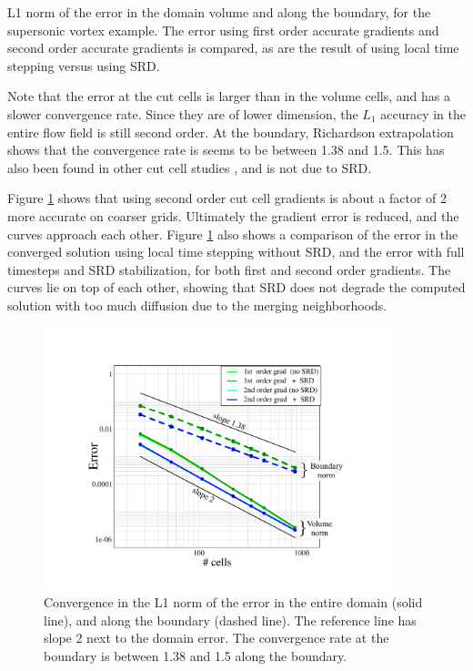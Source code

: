{\begin{table}[h]
	\caption{\sf L1 norm of the error in the domain volume and along the boundary,
        for the supersonic vortex example. The error using first order accurate
        gradients and second order accurate gradients is compared, as are  the result
        of using local time stepping versus using SRD.}
\end{table}
}

Note that the error at the cut cells is larger than in the volume cells, and has a
slower convergence rate. Since they are of lower dimension, the $L_1$
accuracy in the entire flow field is still second order.  At the boundary,
Richardson extrapolation shows that the convergence rate is seems to be
between 1.38 and 1.5.
This has also been found in other cut cell studies \cite{XX}, and is not due to
SRD.

Figure \ref{fig:ssv} shows that using second order cut cell gradients is about
a factor of 2 more accurate on coarser grids. Ultimately the gradient
error is reduced, and the  curves approach each other. 
Figure \ref{fig:ssv} also shows a comparison of the error in the converged
solution using local time stepping without SRD, and the error with full timesteps and
SRD stabilization, for both first and second order gradients.
The curves lie on top of each other, showing that 
SRD does not degrade the computed solution with too much diffusion due
to the merging neighborhoods.

\begin{figure}
	\begin{center}
		\includegraphics[height=3.0in]{figs/ssvconv.pdf}
		\caption{\sf Convergence in the L1 norm of the error in the entire 
			domain  (solid line), and along the boundary (dashed line).
			The reference line has slope 2 next to the domain error. The convergence
			rate at the boundary is between 1.38 and 1.5
			along the boundary.
			\label{fig:ssv}}
	\end{center}
\end{figure}


